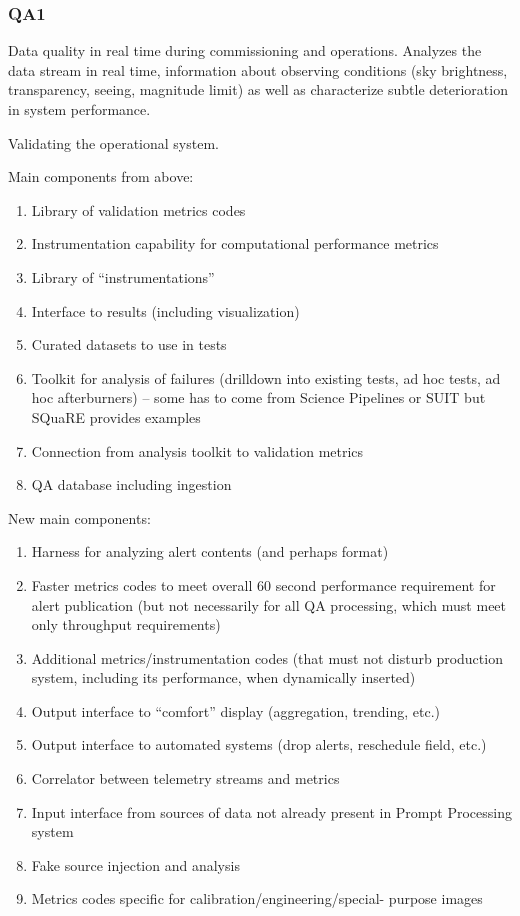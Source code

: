 \subsubsection{QA1}
Data quality in real time during commissioning and operations. Analyzes the data stream in real time, information about observing conditions (sky brightness, transparency, seeing, magnitude limit) as well as characterize subtle deterioration in system performance.

Validating the operational system.

Main components from above:
\begin{enumerate}
\item Library of validation metrics codes
\item Instrumentation capability for computational performance metrics
\item Library of “instrumentations”
\item Interface to results (including visualization)
\item Curated datasets to use in tests
\item Toolkit for analysis of failures (drilldown into existing tests, ad hoc tests, ad hoc afterburners) – some has to come from Science Pipelines or SUIT but SQuaRE provides examples
\item Connection from analysis toolkit to validation metrics
\item QA database including ingestion
\end{enumerate}

New main components:
\begin{enumerate}
\item Harness for analyzing alert contents (and perhaps format)
\item Faster metrics codes to meet overall 60 second performance requirement for alert publication (but not necessarily for all QA processing, which must meet only throughput requirements)
\item Additional metrics/instrumentation codes (that must not disturb production system, including its performance, when dynamically inserted)
\item Output interface to “comfort” display (aggregation, trending, etc.)
\item Output interface to automated systems (drop alerts, reschedule field, etc.)
\item Correlator between telemetry streams and metrics
\item Input interface from sources of data not already present in Prompt Processing system
\item Fake source injection and analysis
\item Metrics codes specific for calibration/engineering/special- purpose images
\end{enumerate}

